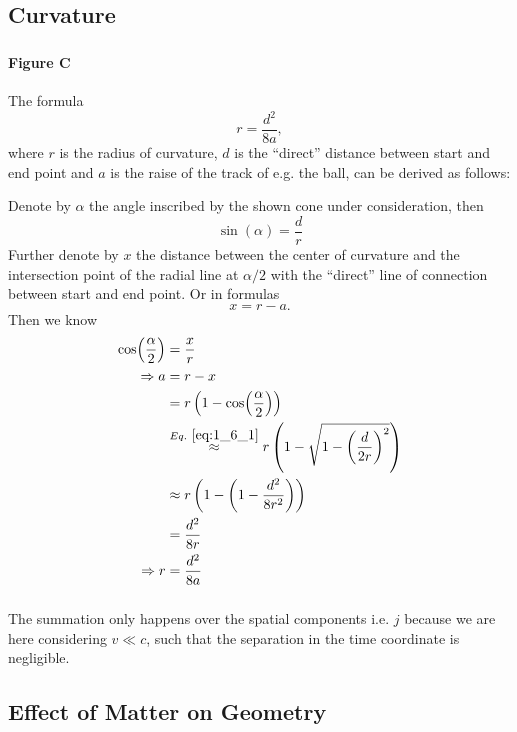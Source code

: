 \subsection{Curvature}\label{susec:1_6}
\subsubsection{ }
\paragraph{Figure C }
The formula \[r=\dfrac{d^2}{8 a},\]
where $r$ is the radius of curvature, $d$ is the \enquote{direct} distance between start and end point 
and $a$ is the raise of the track of e.g. the ball, can be derived as follows:

Denote by $\alpha$ the angle inscribed by the shown cone under consideration, then
\begin{equation} 
	\sin(\alpha)=\dfrac{d}{r} \label{eq:1_6_1}
\end{equation}
 Further denote by $x$ the distance between the center of curvature and the intersection point of the radial line at $\alpha/2$ with the \enquote{direct} line of connection between start and end point. Or in formulas \[x=r-a.\]
 Then we know
 \begin{align*} 
 	\cos(\dfrac{\alpha}{2})&=\dfrac{x}{r}\\
	\Rightarrow a&=r-x\\
	&=r\left(1-\cos(\dfrac{\alpha}{2})\right)\\
	&\overset{\crefeq{1_6_1}}{\approx}r\left(1-\sqrt{1-\left(\dfrac{d}{2r}\right)^2}\right)\\
	&\approx r\left(1-\left(1-\dfrac{d^2}{8r^2}\right)\right)\\
	&=\dfrac{d^2}{8r}\\
	\Rightarrow r &=\dfrac{d^2}{8a}
 \end{align*}

\subsubsection{ }
The summation only happens over the spatial components i.e. $j$ because we are here considering $v\ll c$, such that the separation in the time coordinate is negligible.


\subsection{Effect of Matter on Geometry}\label{susec:1_7}
